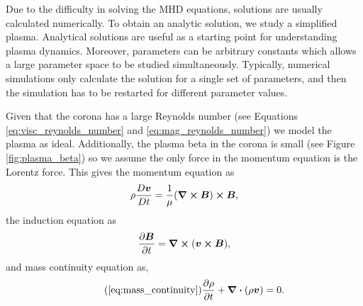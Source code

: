 Due to the difficulty in solving the MHD equations, solutions are usually calculated numerically. To obtain an analytic solution, we study a simplified plasma. Analytical solutions are useful as a starting point for understanding plasma dynamics. Moreover, parameters can be arbitrary constants which allows a large parameter space to be studied simultaneously. Typically, numerical simulations only calculate the solution for a single set of parameters, and then the simulation has to be restarted for different parameter values.

Given that the corona has a large Reynolds number (see Equations \ref{eq:visc_reynolds_number} and \ref{eq:mag_reynolds_number}) we model the plasma as ideal. Additionally, the plasma beta in the corona is small (see Figure \ref{fig:plasma_beta}) so we assume the only force in the momentum equation is the Lorentz force. This gives the momentum equation as
\begin{equation}
    \label{eq:momentum_eqn_beta=0}
    \rho\frac{D \boldsymbol{v}}{D t}=\frac{1}{\mu}(\curl{\boldsymbol{B}})\cross\boldsymbol{B},
\end{equation}
the induction equation as
\begin{equation}
    \label{eq:induction_eqn_ideal}
    \pdv{\boldsymbol{B}}{t}=\curl(\boldsymbol{v}\cross\boldsymbol{B}),
\end{equation}
and mass continuity equation as,
\begin{equation}
    \tag{\ref{eq:mass_continuity}}
    \pdv{\rho}{t}+\div(\rho\vec{v})=0.
\end{equation}

